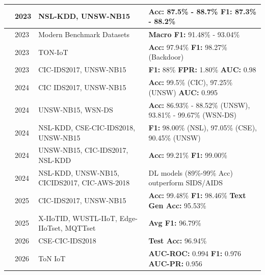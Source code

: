 \documentclass[12pt, a4paper]{report}
\begin{document}
\begin{longtable}{|p{3cm}|p{1.5cm}|p{4cm}|p{5cm}|}
\cite{liu2023intrusion} & 2023 & NSL-KDD, UNSW-NB15 & \textbf{Acc:} 87.5\% - 88.7\% \newline \textbf{F1:} 87.3\% - 88.2\% \\ \hline

\cite{caville2023anomal} & 2023 & Modern Benchmark Datasets & \textbf{Macro F1:} 91.48\% - 93.04\% \\ \hline

\cite{hairab2023anomaly} & 2023 & TON-IoT & \textbf{Acc:} 97.94\% \newline \textbf{F1:} 98.27\% (Backdoor) \\ \hline

\cite{appani2023selfsupervised} & 2023 & CIC-IDS2017, UNSW-NB15 & \textbf{F1:} 88\% \newline \textbf{FPR:} 1.80\% \newline \textbf{AUC:} 0.98 \\ \hline

\cite{he2024network} & 2024 & CIC IDS2017, UNSW-NB15 & \textbf{Acc:} 99.5\% (CIC), 97.25\% (UNSW) \newline \textbf{AUC:} 0.995 \\ \hline

\cite{abed2024modified} & 2024 & UNSW-NB15, WSN-DS & \textbf{Acc:} 86.93\% - 88.52\% (UNSW), 93.81\% - 99.67\% (WSN-DS) \\ \hline

\cite{manocchio2024flowtransformer} & 2024 & NSL-KDD, CSE-CIC-IDS2018, UNSW-NB15 & \textbf{F1:} 98.00\% (NSL), 97.05\% (CSE), 90.45\% (UNSW) \\ \hline

\cite{ullah2024ids} & 2024 & UNSW-NB15, CIC-IDS2017, NSL-KDD & \textbf{Acc:} 99.21\% \newline \textbf{F1:} 99.00\% \\ \hline

\cite{armijos2024zeroday} & 2024 & NSL-KDD, UNSW-NB15, CICIDS2017, CIC-AWS-2018 & DL models (89\%-99\% Acc) outperform SIDS/AIDS \\ \hline

\cite{rajkumardheivanayahi2025explainability} & 2025 & CIC-IDS2017, UNSW-NB15 & \textbf{Acc:} 99.48\% \newline \textbf{F1:} 98.46\% \newline \textbf{Text Gen Acc:} 95.53\% \\ \hline

\cite{safe2025} & 2025 & X-IIoTID, WUSTL-IIoT, Edge-IIoTset, MQTTset & \textbf{Avg F1:} 96.79\% \\ \hline

\cite{appiahene2026network} & 2026 & CSE-CIC-IDS2018 & \textbf{Test Acc:} 96.94\% \\ \hline

\cite{nayak2026threatformer} & 2026 & ToN IoT & \textbf{AUC-ROC:} 0.994 \newline \textbf{F1:} 0.976 \newline \textbf{AUC-PR:} 0.956 \\ \hline

\end{longtable}
\end{document}

